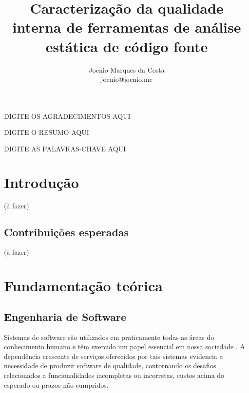 \documentclass[qual, classic, a4paper]{ufbathesis}
\title{
  Caracterização da qualidade interna de ferramentas de análise estática de
  código fonte
}
\author{Joenio Marques da Costa\\
  {\small joenio@joenio.me}
}
\begin{document}
\frontpage
\frontmatter
\presentationpage

\acknowledgements
DIGITE OS AGRADECIMENTOS AQUI

\resumo
DIGITE O RESUMO AQUI

\begin{keywords}
DIGITE AS PALAVRAS-CHAVE AQUI
\end{keywords}

%

\tableofcontents
\listoffigures
\listoftables
\mainmatter

\chapter{Introdução}

(à fazer)


\section{Contribuições esperadas}

(à fazer)

\chapter{Fundamentação teórica}

% 
% 
% 
% 

\section{Engenharia de Software}

Sistemas de software são utilizados em praticamente todas as áreas do
conhecimento humano e têm exercido um papel essencial em nossa sociedade
\cite{Mafra2006}. A dependência crescente de serviços oferecidos por tais
sistemas evidencia a necessidade de produzir software de qualidade,
contornando os  desafios relacionados a funcionalidades incompletas ou
incorretas, custos acima do esperado ou prazos não cumpridos.
\end{document}
